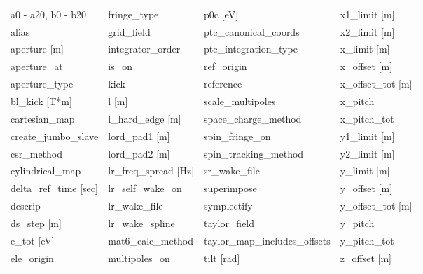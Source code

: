  \begin{tabular}{llll} \toprule
a0 - a20, b0 - b20             & fringe_type                    & p0c [eV]                       & x1_limit [m]                   \\
alias                          & grid_field                     & ptc_canonical_coords           & x2_limit [m]                   \\
aperture [m]                   & integrator_order               & ptc_integration_type           & x_limit [m]                    \\
aperture_at                    & is_on                          & ref_origin                     & x_offset [m]                   \\
aperture_type                  & kick                           & reference                      & x_offset_tot [m]               \\
bl_kick [T*m]                  & l [m]                          & scale_multipoles               & x_pitch                        \\
cartesian_map                  & l_hard_edge [m]                & space_charge_method            & x_pitch_tot                    \\
create_jumbo_slave             & lord_pad1 [m]                  & spin_fringe_on                 & y1_limit [m]                   \\
csr_method                     & lord_pad2 [m]                  & spin_tracking_method           & y2_limit [m]                   \\
cylindrical_map                & lr_freq_spread [Hz]            & sr_wake_file                   & y_limit [m]                    \\
delta_ref_time [sec]           & lr_self_wake_on                & superimpose                    & y_offset [m]                   \\
descrip                        & lr_wake_file                   & symplectify                    & y_offset_tot [m]               \\
ds_step [m]                    & lr_wake_spline                 & taylor_field                   & y_pitch                        \\
e_tot [eV]                     & mat6_calc_method               & taylor_map_includes_offsets    & y_pitch_tot                    \\
ele_origin                     & multipoles_on                  & tilt [rad]                     & z_offset [m]                   \\

\end{tabular}
